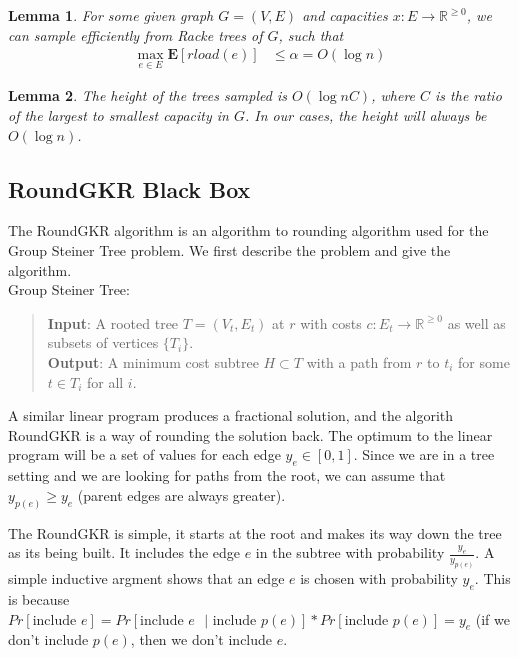 \documentclass[12pt]{article}
\newtheorem{lemma}{Lemma}
\begin{document}
\begin{lemma}
\label{lem:rload}
For some given graph $G = (V, E)$ and capacities $x: E \rightarrow \mathbb{R}^{\geq 0}$, we can sample efficiently from Racke trees of $G$, such that 
\begin{align}
\max_{e \in E} \textbf{E}[rload(e)] &\leq \alpha = O(\log n) 
\end{align}
\end{lemma}

\begin{lemma}
\label{thm:height}
The height of the trees sampled is $O(\log nC)$, where $C$ is the ratio of the largest to smallest capacity in $G$. In our cases, the height will always be $O(\log n)$. 
\end{lemma}

\subsection{RoundGKR Black Box}

The RoundGKR algorithm is an algorithm to rounding algorithm used for the Group Steiner Tree problem. We first describe the problem and give the algorithm. \\

Group Steiner Tree:
\begin{quote}
\textbf{Input}: A rooted tree $T = (V_t, E_t)$ at $r$ with costs $c: E_t \rightarrow \mathbb{R}^{\geq 0}$ as well as subsets of vertices $\{ T_i \}$. \\
\textbf{Output}: A minimum cost subtree $H \subset T$ with a path from $r$ to $t_i$ for some $t \in T_i$ for all $i$.
\end{quote}

A similar linear program produces a fractional solution, and the algorith RoundGKR is a way of rounding the solution back. The optimum to the linear program will be a set of values for each edge $y_e \in [0, 1]$. Since we are in a tree setting and we are looking for paths from the root, we can assume that $y_{p(e)} \geq y_e$ (parent edges are always greater).

The RoundGKR is simple, it starts at the root and makes its way down the tree as its being built. It includes the edge $e$ in the subtree with probability $\frac{y_e}{y_{p(e)}}$. A simple inductive argment shows that an edge $e$ is chosen with probability $y_e$. This is because $Pr[\text{include $e$}] = Pr[\text{include $e$ $|$ include $p(e)$}]*Pr[\text{include $p(e)$}] = y_e$ (if we don't include $p(e)$, then we don't include $e$. 
\end{document}
